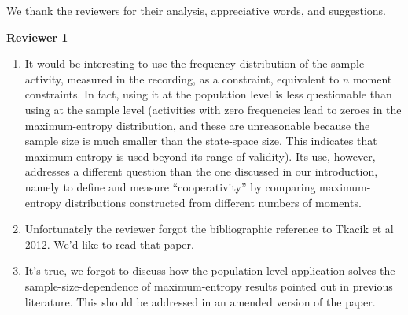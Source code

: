 \documentclass{article}
\begin{document}
We thank the reviewers for their analysis, appreciative words, and suggestions.

\textbf{Reviewer 1}
\begin{enumerate}
\item It would be interesting to use the frequency distribution of the
  sample activity, measured in the recording, as a constraint, equivalent
  to $n$ moment constraints. In fact, using it at the population level is
  less questionable than using at the sample level (activities with zero
  frequencies lead to zeroes in the maximum-entropy distribution, and these
  are unreasonable because the sample size is much smaller than the
  state-space size. This indicates that maximum-entropy is used beyond its
  range of validity). Its use, however, addresses a different question than
  the one discussed in our introduction, namely to define and measure
  \enquote{cooperativity} by comparing maximum-entropy distributions
  constructed from different numbers of moments.
\item Unfortunately the reviewer forgot the bibliographic reference to Tkacik et al
  2012. We'd like to read that paper.
\item It's true, we forgot to discuss how the population-level application
  solves the sample-size-dependence of maximum-entropy results pointed out in
  previous literature. This should be addressed in an amended version of
  the paper.
\end{enumerate}

\bigskip
\end{document}

